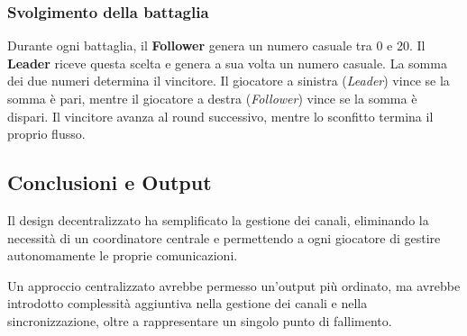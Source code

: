 \subsubsection{Svolgimento della battaglia}
Durante ogni battaglia, il \textbf{Follower} genera un numero casuale tra 0 e 20. Il \textbf{Leader} riceve questa scelta e genera a sua volta un numero casuale. La somma dei due numeri determina il vincitore.
Il giocatore a sinistra (\emph{Leader}) vince se la somma è pari, mentre il giocatore a destra (\emph{Follower}) vince se la somma è dispari. Il vincitore avanza al round successivo, mentre lo sconfitto termina il proprio flusso.

\subsection{Conclusioni e Output}
Il design decentralizzato ha semplificato la gestione dei canali, eliminando la necessità di un coordinatore centrale e permettendo a ogni giocatore di gestire autonomamente le proprie comunicazioni. 

Un approccio centralizzato avrebbe permesso un'output più ordinato, ma avrebbe introdotto complessità aggiuntiva nella gestione dei canali e nella sincronizzazione, oltre a rappresentare un singolo punto di fallimento.